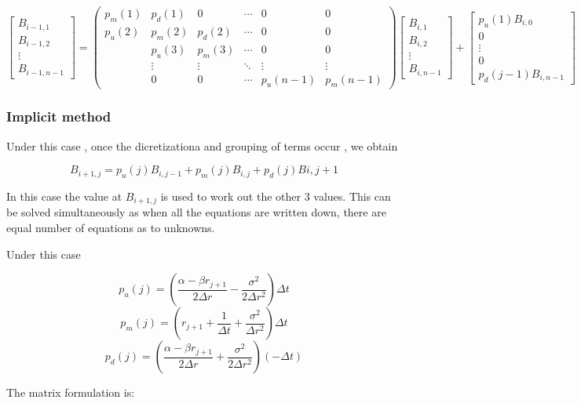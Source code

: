\documentclass[12pt,a4paper]{article}
\begin{document}
$$\begin{bmatrix}
	B_{i-1,1} \\
	B_{i-1,2} \\
	\vdots \\       
	B_{i-1,n-1}
	\end{bmatrix}
=
\left( \begin{array}{cccccc}
p_m(1) & p_d(1) & 0 & \cdots  & 0 & 0\\
p_u(2) & p_m(2) & p_d(2) &\cdots & 0 & 0 \\
& p_u(3) & p_m(3) & \cdots & 0 & 0  \\
& \vdots &\vdots & \ddots & \vdots & \vdots \\ 
& 0 & 0 & \cdots & p_u(n-1) & p_m(n-1) \end{array} \right) 
%
\begin{bmatrix}
	B_{i,1} \\
	B_{i,2} \\
	\vdots \\       
	B_{i,n-1}
\end{bmatrix}
+
 \begin{bmatrix}
	p_u(1)B_{i,0} \\
	0 \\
	\vdots \\
	0 \\
	p_d(j-1)B_{i,n-1}
	\end{bmatrix}  
$$
 
 
 
\subsubsection{ Implicit method}

Under this case , once the dicretizationa and grouping of terms occur , we obtain

$$B_{i+1,j}= p_u(j)B_{i,j-1}+p_m(j)B_{i,j}+p_d(j)B{i,j+1} $$

In this case the value at $B_{i+1,j}$ is used to work out the other 3 values. This can be solved simultaneously as when all the equations are written down, there are equal number of equations as to unknowns.


Under this case

$$p_u(j)= (\frac{\alpha-\beta r_{j+1}}{2\Delta r} - \frac{\sigma^2}{2\Delta r^2})\Delta t$$ 
$$p_m(j)= (r_{j+1}+\frac{1}{\Delta t} + \frac{\sigma^2}{\Delta r ^2})\Delta t$$
$$p_d(j)= (\frac{\alpha-\beta r_{j+1}}{2\Delta r} + \frac{\sigma^2}{2\Delta r^2})(-\Delta t) $$

The matrix formulation is:
\end{document}
